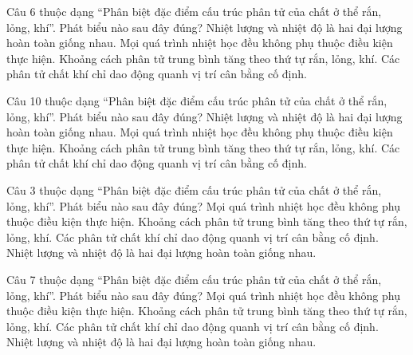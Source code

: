 \begin{ex}
Câu 6 thuộc dạng “Phân biệt đặc điểm cấu trúc phân tử của chất ở thể rắn, lỏng, khí”. Phát biểu nào sau đây đúng?
\choice
{Nhiệt lượng và nhiệt độ là hai đại lượng hoàn toàn giống nhau.}
{Mọi quá trình nhiệt học đều không phụ thuộc điều kiện thực hiện.}
{\True Khoảng cách phân tử trung bình tăng theo thứ tự rắn, lỏng, khí.}
{Các phân tử chất khí chỉ dao động quanh vị trí cân bằng cố định.}
\end{ex}

\begin{ex}
Câu 10 thuộc dạng “Phân biệt đặc điểm cấu trúc phân tử của chất ở thể rắn, lỏng, khí”. Phát biểu nào sau đây đúng?
\choice
{Nhiệt lượng và nhiệt độ là hai đại lượng hoàn toàn giống nhau.}
{Mọi quá trình nhiệt học đều không phụ thuộc điều kiện thực hiện.}
{\True Khoảng cách phân tử trung bình tăng theo thứ tự rắn, lỏng, khí.}
{Các phân tử chất khí chỉ dao động quanh vị trí cân bằng cố định.}
\end{ex}

\begin{ex}
Câu 3 thuộc dạng “Phân biệt đặc điểm cấu trúc phân tử của chất ở thể rắn, lỏng, khí”. Phát biểu nào sau đây đúng?
\choice
{Mọi quá trình nhiệt học đều không phụ thuộc điều kiện thực hiện.}
{\True Khoảng cách phân tử trung bình tăng theo thứ tự rắn, lỏng, khí.}
{Các phân tử chất khí chỉ dao động quanh vị trí cân bằng cố định.}
{Nhiệt lượng và nhiệt độ là hai đại lượng hoàn toàn giống nhau.}
\end{ex}

\begin{ex}
Câu 7 thuộc dạng “Phân biệt đặc điểm cấu trúc phân tử của chất ở thể rắn, lỏng, khí”. Phát biểu nào sau đây đúng?
\choice
{Mọi quá trình nhiệt học đều không phụ thuộc điều kiện thực hiện.}
{\True Khoảng cách phân tử trung bình tăng theo thứ tự rắn, lỏng, khí.}
{Các phân tử chất khí chỉ dao động quanh vị trí cân bằng cố định.}
{Nhiệt lượng và nhiệt độ là hai đại lượng hoàn toàn giống nhau.}
\end{ex}

